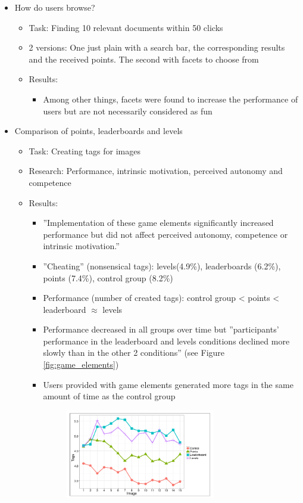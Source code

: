 \documentclass{article}
\theoremstyle{definition}
\theoremstyle{remark}
\begin{document}
\begin{itemize}
    
    \item How do users browse? \cite{user_behavior}
    \begin{itemize}
        \item Task: Finding 10 relevant documents within 50 clicks
        \item 2 versions: One just plain with a search bar, the corresponding results and the received points. The second with facets to choose from
        \item Results:
        \begin{itemize}
            \item Among other things, facets were found to increase the performance of users but are not necessarily considered as fun
        \end{itemize}
    \end{itemize}
    \item Comparison of points, leaderboards and levels \cite{game_elements}
    \begin{itemize}
        \item Task: Creating tags for images
        \item Research: Performance, intrinsic motivation, perceived autonomy and competence 
        \item Results:
        \begin{itemize}
            \item ''Implementation of these game elements significantly increased performance but did not affect perceived autonomy, competence or intrinsic motivation.'' \cite{game_elements}
            \item ''Cheating'' (nonsensical tags): levels(4.9\%), leaderboards (6.2\%), points (7.4\%), control group (8.2\%)
            \item Performance (number of created tags): control group < points < leaderboard $\approx$ levels
            \item Performance decreased in all groups over time but ''participants' performance in the leaderboard and levels conditions declined more slowly than in the other 2 conditions''\cite{game_elements} (see Figure \ref{fig:game_elements})
            \item Users provided with game elements generated more tags in the same amount of time as the control group
            \begin{figure}[h!]
                \centering
                \includegraphics[width=0.7\textwidth]{images/game_elements.png}

\end{figure}
\end{itemize}
\end{itemize}
\end{itemize}
\end{document}

